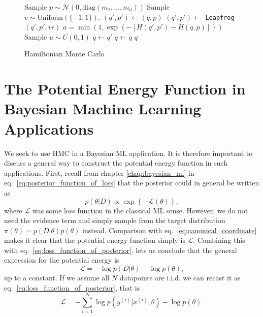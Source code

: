 \begin{figure}[H]
	\begin{algorithm}[H]
		\caption{Hamiltonian Monte Carlo}\label{algo:hmc}
		\begin{algorithmic}
      \State Sample $p \sim \mathcal{N}(0, \text{diag}(m_1, \ldots, m_d))$ 
      \State Sample $v \sim \text{Uniform}(\{-1, 1\})$. 
      \State $(q', p') \leftarrow (q, p)$    
       
        \State $(q', p') \leftarrow$ {\tt Leapfrog}$(q', p', v\epsilon)$ 
      \EndFor
      \State $a = \min \left(1, \exp\left\{-\left[H(q',p') - H(q, p)\right]\right\}\right)$ 
      \State Sample $u \sim U(0,1)$ 
       
        \State $q \gets q'$ 
      \Else
        \State $q \gets q$ 
      \EndIf
      \State \Return $q$
      \EndFunction
		\end{algorithmic}
	\end{algorithm}
\end{figure}

\section{The Potential Energy Function in Bayesian Machine Learning Applications}
We seek to use HMC in a Bayesian ML application. It is therefore important to
discuss a general way to construct the potential energy function in such applications.
First, recall from chapter \ref{chap:bayesian_ml} in eq.~\eqref{eq:posterior_function_of_loss} that the posterior could in general be written as
\begin{equation}
  p(\theta|D) \propto \exp\left\{-\mathcal{L}(\theta)\right\},
\end{equation}
where $\mathcal{L}$ was some loss function in the classical ML sense.
However, we do not need the evidence term and simply sample from the target distribution $\pi(\theta) = p(D|\theta)p(\theta)$ instead.
Comparison with eq.~\eqref{eq:canonical_coordinate} makes it clear that the potential energy
function simply is $\mathcal{L}$. Combining this with eq.~\eqref{eq:loss_function_of_posterior}, lets us conclude that the general expression
for the potential energy is
\begin{equation}
  \mathcal{L} = - \log p(D|\theta) - \log p(\theta),
\end{equation}
up to a constant.
If we assume all $N$ datapoints are i.i.d. we can recast it as eq.~\eqref{eq:loss_function_of_posterior}, that is
\begin{equation}\label{eq:potential_energy_bayesian}
  \mathcal{L} = -\sum_{i=1}^N \log p(y^{(i)}|x^{(i)}, \theta) - \log p(\theta).
\end{equation}

